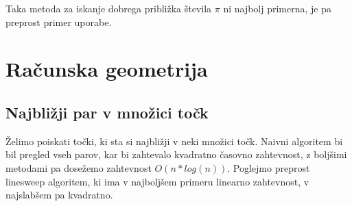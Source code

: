 \documentclass[10pt,a4paper,oneside]{book}
\begin{document}

Taka metoda za iskanje dobrega približka števila $\pi$ ni najbolj primerna, je pa preprost primer uporabe.

\chapter{Računska geometrija}
\section{Najbližji par v množici točk}
Želimo poiskati točki, ki sta si najbližji v neki množici točk. Naivni algoritem bi bil pregled vseh parov, kar bi zahtevalo kvadratno časovno zahtevnost, z boljšimi metodami pa dosežemo zahtevnost $O(n*log(n))$. Poglejmo preprost linesweep algoritem, ki ima v najboljšem primeru linearno zahtevnost, v najslabšem pa kvadratno.


%

\end{document}
